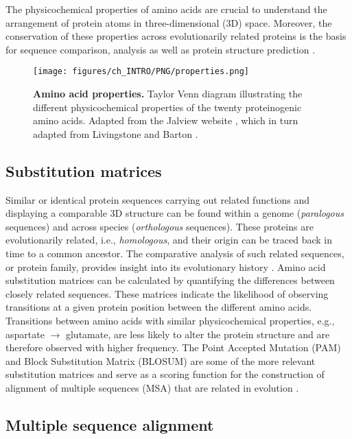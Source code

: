 The physicochemical properties of amino acids are crucial to understand the arrangement of protein atoms in three-dimensional (3D) space. Moreover, the conservation of these properties across evolutionarily related proteins is the basis for sequence comparison, analysis as well as protein structure prediction \cite{CHOTHIA_1986_CONSERVATION}.

\begin{figure}[htb!]
    \centering
    \texttt{[image: figures/ch\_INTRO/PNG/properties.png]}
    \caption[Amino acid properties]{\textbf{Amino acid properties.} Taylor Venn diagram illustrating the different physicochemical properties of the twenty proteinogenic amino acids. Adapted from the Jalview website \cite{JALVIEW}, which in turn adapted from Livingstone and Barton \cite{LIVINGSTONE_1993_MSA}.}
    \label{fig:properties}
\end{figure}

\subsection{Substitution matrices}

Similar or identical protein sequences carrying out related functions and displaying a comparable 3D structure can be found within a genome (\textit{paralogous} sequences) and across species (\textit{orthologous} sequences). These proteins are evolutionarily related, i.e., \textit{homologous}, and their origin can be traced back in time to a common ancestor. The comparative analysis of such related sequences, or protein family, provides insight into its evolutionary history \cite{BARTON_1990_MSA}. Amino acid substitution matrices can be calculated by quantifying the differences between closely related sequences. These matrices indicate the likelihood of observing transitions at a given protein position between the different amino acids. Transitions between amino acids with similar physicochemical properties, e.g., aspartate $\rightarrow$ glutamate, are less likely to alter the protein structure and are therefore observed with higher frequency. The Point Accepted Mutation (PAM) \cite{DAYHOFF_1978_PAM} and Block Substitution Matrix (BLOSUM) \cite{HENIKOFF_1992_BLOSUM} are some of the more relevant substitution matrices and serve as a scoring function for the construction of alignment of multiple sequences (MSA) that are related in evolution \cite{BARTON_1987_MSA}.

\subsection{Multiple sequence alignment}

